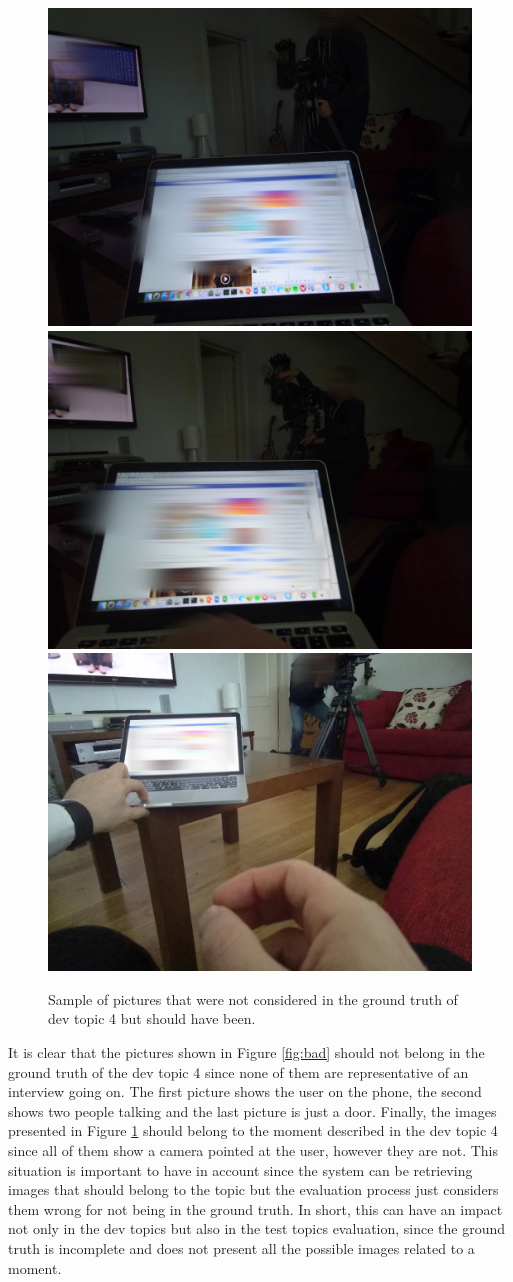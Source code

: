     \begin{figure}[H]
        \centering
        \captionsetup{justification=centering}
        \includegraphics[width=.32\linewidth]{Sections/5ImageClef/images/1_ngt.jpg}
        \includegraphics[width=.32\linewidth]{Sections/5ImageClef/images/2_ngt.jpg}
        \includegraphics[width=.32\linewidth]{Sections/5ImageClef/images/3_ngt.jpg}
        \caption[Pictures that should belong in the ground truth]{Sample of pictures that were not considered in the ground truth of dev topic 4 but should have been.}
        \label{fig:good}
        \end{figure}
     
    It is clear that the pictures shown in Figure \ref{fig:bad} should not belong in the ground truth of the dev topic 4 since none of them are representative of an interview going on. The first picture shows the user on the phone, the second shows two people talking and the last picture is just a door. Finally, the images presented in Figure \ref{fig:good} should belong to the moment described in the dev topic 4 since all of them show a camera pointed at the user, however they are not.  This situation is important to have in account since the system can be retrieving images that should belong to the topic but the evaluation process just considers them wrong for not being in the ground truth. In short, this can have an impact not only in the dev topics but also in the test topics evaluation, since the ground truth is incomplete and does not present all the possible images related to a moment.
